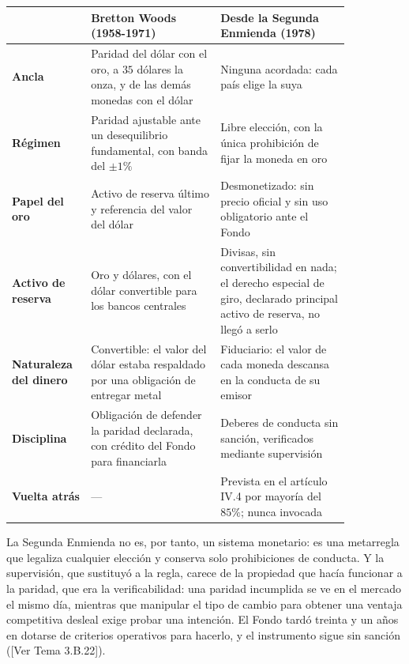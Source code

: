 \documentclass[10pt,a4paper]{article}
\newcommand{\authorfont}[1]{{\fontfamily{EBGaramond-TLF}\selectfont #1}}
\begin{document}
\begin{center}
{\footnotesize
\begin{tabular}{|p{0.17\linewidth}|p{0.34\linewidth}|p{0.34\linewidth}|}
\hline
 & \textbf{Bretton Woods (1958-1971)} & \textbf{Desde la Segunda Enmienda (1978)} \\
\hline
\textbf{Ancla} & Paridad del dólar con el oro, a $35$ dólares la onza, y de las demás monedas con el dólar & Ninguna acordada: cada país elige la suya \\
\hline
\textbf{Régimen} & Paridad ajustable ante un desequilibrio fundamental, con banda del $\pm 1\%$ & Libre elección, con la única prohibición de fijar la moneda en oro \\
\hline
\textbf{Papel del oro} & Activo de reserva último y referencia del valor del dólar & Desmonetizado: sin precio oficial y sin uso obligatorio ante el Fondo \\
\hline
\textbf{Activo de reserva} & Oro y dólares, con el dólar convertible para los bancos centrales & Divisas, sin convertibilidad en nada; el derecho especial de giro, declarado principal activo de reserva, no llegó a serlo \\
\hline
\textbf{Naturaleza del dinero} & Convertible: el valor del dólar estaba respaldado por una obligación de entregar metal & Fiduciario: el valor de cada moneda descansa en la conducta de su emisor \\
\hline
\textbf{Disciplina} & Obligación de defender la paridad declarada, con crédito del Fondo para financiarla & Deberes de conducta sin sanción, verificados mediante supervisión \\
\hline
\textbf{Vuelta atrás} & --- & Prevista en el artículo IV.4 por mayoría del $85\%$; nunca invocada \\
\hline
\end{tabular}}
\end{center}

La Segunda Enmienda no es, por tanto, un sistema monetario: es una metarregla que legaliza cualquier elección y conserva solo prohibiciones de conducta. Y la supervisión, que sustituyó a la regla, carece de la propiedad que hacía funcionar a la paridad, que era la verificabilidad: una paridad incumplida se ve en el mercado el mismo día, mientras que manipular el tipo de cambio para obtener una ventaja competitiva desleal exige probar una intención. El Fondo tardó treinta y un años en dotarse de criterios operativos para hacerlo, y el instrumento sigue sin sanción ([\authorfont{Ver Tema 3.B.22}]).
\end{document}
